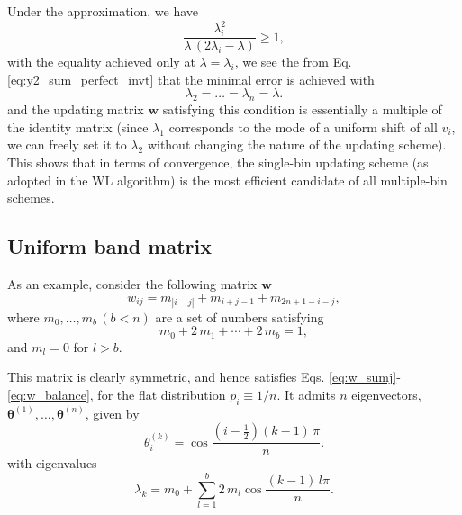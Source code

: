 \documentclass[reprint]{revtex4-1}
\begin{document}
Under the approximation, we have
$$
\frac{ \lambda_i^2 }{ \lambda \, (2 \lambda_i - \lambda) } \ge 1,
$$
with the equality achieved only at $\lambda = \lambda_i$,
we see the from Eq. \eqref{eq:y2_sum_perfect_invt}
that the minimal error is achieved with
\begin{equation}
  \lambda_2 = \dots = \lambda_n = \lambda.
\end{equation}
%
and the updating matrix $\mathbf w$ satisfying this condition
is essentially a multiple of the identity matrix
(since $\lambda_1$ corresponds to the mode
of a uniform shift of all $v_i$,
we can freely set it to $\lambda_2$
without changing the nature of the updating scheme).
%
This shows that in terms of convergence,
the single-bin updating scheme
(as adopted in the WL algorithm)
is the most efficient candidate
of all multiple-bin schemes.



\subsection{Uniform band matrix}



As an example, consider the following matrix $\mathbf w$
%
\begin{equation}
  w_{ij} = m_{|i-j|} + m_{i+j-1} + m_{2n+1-i-j},
  \label{eq:w_band}
\end{equation}
%
where $m_0, \dots, m_b \, (b < n)$
are a set of numbers satisfying
%
\begin{equation}
m_0 + 2 \, m_1 + \cdots + 2 \, m_b = 1,
\label{eq:m_normalization}
\end{equation}
%
and $m_l = 0$ for $l > b$.


This matrix is clearly symmetric, and hence
satisfies Eqs. \eqref{eq:w_sumj}-\eqref{eq:w_balance},
for the flat distribution $p_i \equiv 1/n$.
%
It admits $n$ eigenvectors,
$\pmb\theta^{(1)}, \dots, \pmb\theta^{(n)}$,
given by
%
\begin{equation}
\theta^{(k)}_i
= \cos \frac{ \left(i - \frac12\right) (k - 1) \, \pi}{n}.
\label{eq:wband_eigenvector}
\end{equation}
%
with eigenvalues
\begin{equation}
  \lambda_k = m_0 + \sum_{l = 1}^b 2 \, m_l \cos \frac{(k - 1)  \, l \pi}{n}.
\label{eq:wband_eigenvalue}
\end{equation}
\end{document}
